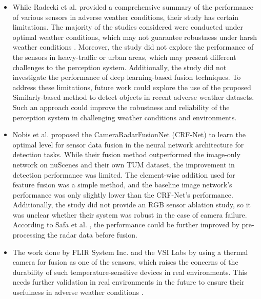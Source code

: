 \documentclass[rnd]{mas_proposal}
\begin{document}
\begin{itemize}

    
      \item While Radecki et al. \cite{radecki2016all} provided a comprehensive summary of the performance of various sensors in adverse weather conditions, their study has certain limitations. The majority of the studies considered were conducted under optimal weather conditions, which may not guarantee robustness under harsh weather conditions \cite{emzivat2018formal}. Moreover, the study did not explore the performance of the sensors in heavy-traffic or urban areas, which may present different challenges to the perception system. Additionally, the study did not investigate the performance of deep learning-based fusion techniques. To address these limitations, future work could explore the use of the proposed Similarly-based method to detect objects in recent adverse weather datasets. Such an approach could improve the robustness and reliability of the perception system in challenging weather conditions and environments.

      \item Nobis et al. \cite{nobis2019deep} proposed the CameraRadarFusionNet (CRF-Net) to learn the optimal level for sensor data fusion in the neural network architecture for detection tasks. While their fusion method outperformed the image-only network on nuScenes \cite{caesar2020nuscenes} and their own TUM dataset, the improvement in detection performance was limited. The element-wise addition used for feature fusion was a simple method, and the baseline image network's performance was only slightly lower than the CRF-Net's performance. Additionally, the study did not provide an RGB sensor ablation study, so it was unclear whether their system was robust in the case of camera failure. According to Safa et al. \cite{safa2021fail}, the performance could be further improved by pre-processing the radar data before fusion.
      \item The work done by FLIR System Inc. \cite{fused_aeb} and the VSI Labs \cite{VSILabs} by using a thermal camera for fusion as one of the sensors, which raises the concerns of the durability of such temperature-sensitive devices in real environments. This needs further validation in real environments in the future to ensure their usefulness in adverse weather conditions \cite{zang2019impact}.
      

\end{itemize}
\end{document}
